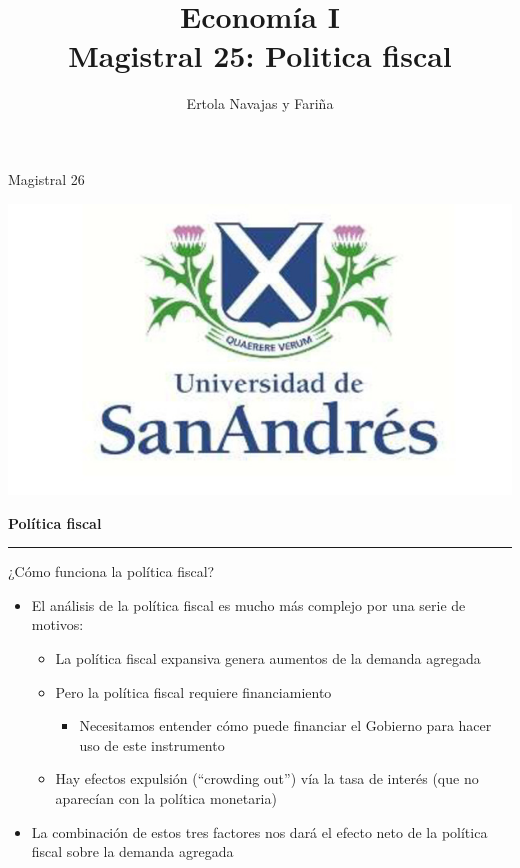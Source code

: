 \documentclass{beamer}
\title[Economía I]{Economía I \vspace{4mm}
\\ Magistral 25: Politica fiscal}
\date{}
\author[Ertola Navajas y Fariña]{Ertola Navajas y Fariña}
\institute[]{Universidad de San Andrés}
\begin{document}
\begin{frame}
\titlepage
\centering
Magistral 26

\includegraphics[scale=0.2]{Slides Principios de Economia/Figures/logoUDESA.jpg} 
\end{frame}

\begin{frame}{}
\centering 	\huge \textbf{Política fiscal} 
\vspace{2mm}
\hrule
\end{frame}


\begin{frame}{¿Cómo funciona la política fiscal?}
    \begin{itemize}
        \item El análisis de la política fiscal es mucho más complejo por una serie de motivos:
        \begin{itemize}
            \item La política fiscal expansiva genera aumentos de la demanda agregada 
            \item Pero la política fiscal requiere financiamiento
            \begin{itemize}
                \item Necesitamos entender cómo puede financiar el Gobierno para hacer uso de este instrumento
            \end{itemize}
            \item Hay efectos expulsión (“crowding out”) vía la tasa de interés (que no aparecían con la política monetaria)
        \end{itemize}
        \vspace{2mm}
        \item La combinación de estos tres factores nos dará el efecto neto de la política fiscal sobre la demanda agregada
    \end{itemize}
\end{frame}
\end{document}
